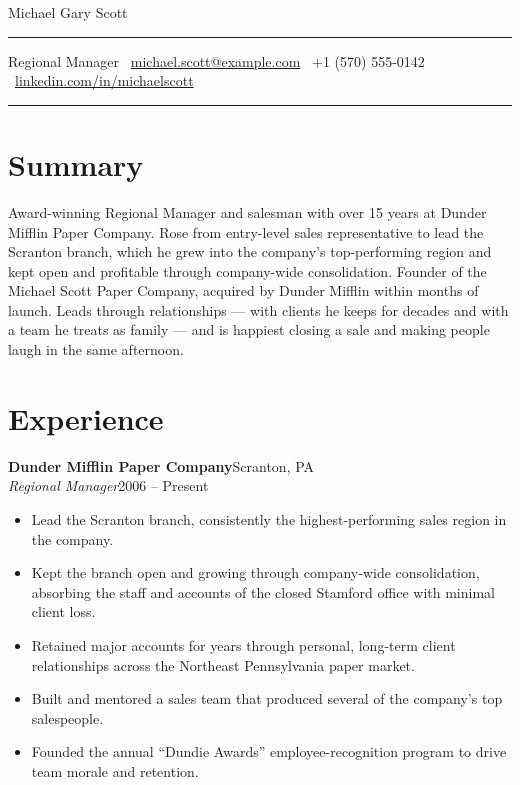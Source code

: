 \documentclass[a4paper,10pt]{article}
\newcommand{\cvheader}[2]{%
  \begin{center}
    {\Huge\color{accentTitle} #1}\\[9pt]
    {\color{accentLine}\hrule}
    \vspace{4pt}
    \footnotesize #2
    \vspace{4pt}
    {\color{accentLine}\hrule}
  \end{center}
  \vspace{4pt}
}
\newcommand{\entry}[4]{%
  \textbf{#1}\hfill #2\\%
  \textit{#3}\hfill #4\par%
}
\newenvironment{bullets}
  {\begin{itemize}[leftmargin=1.4em,itemsep=1.5pt,topsep=2pt,parsep=0pt]}
  {\end{itemize}}
\begin{document}
\cvheader{Michael Gary Scott}{%
  Regional Manager \quad\textbullet\quad
  \faEnvelope\ \href{mailto:michael.scott@example.com}{michael.scott@example.com} \quad\textbullet\quad
  \faPhone\ +1 (570) 555-0142 \quad\textbullet\quad
  \faLinkedin\ \href{https://linkedin.com/in/michaelscott}{linkedin.com/in/michaelscott}%
}

\section{Summary}
Award-winning Regional Manager and salesman with over 15 years at Dunder Mifflin Paper
Company. Rose from entry-level sales representative to lead the Scranton branch, which he
grew into the company's top-performing region and kept open and profitable through
company-wide consolidation. Founder of the Michael Scott Paper Company, acquired by Dunder
Mifflin within months of launch. Leads through relationships --- with clients he keeps for
decades and with a team he treats as family --- and is happiest closing a sale and making
people laugh in the same afternoon.

\section{Experience}
\entry{Dunder Mifflin Paper Company}{Scranton, PA}{Regional Manager}{2006 -- Present}
\begin{bullets}
  \item Lead the Scranton branch, consistently the highest-performing sales region in the
    company.
  \item Kept the branch open and growing through company-wide consolidation, absorbing the
    staff and accounts of the closed Stamford office with minimal client loss.
  \item Retained major accounts for years through personal, long-term client relationships
    across the Northeast Pennsylvania paper market.
  \item Built and mentored a sales team that produced several of the company's top
    salespeople.
  \item Founded the annual ``Dundie Awards'' employee-recognition program to drive team
    morale and retention.
\end{bullets}
\end{document}
